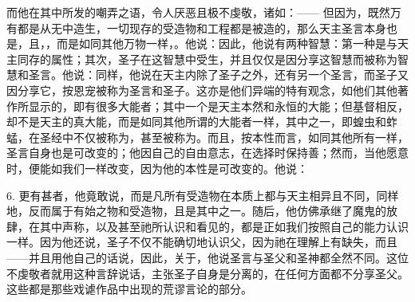 而他在其中所发的嘲弄之语，令人厌恶且极不虔敬，诸如：—— 但因为，既然万有都是从无中造生，一切现存的受造物和工程都是被造的，那么天主圣言本身也是，且，，而是如同其他万物一样，。他说：因此，他说有两种智慧：第一种是与天主同存的属性；其次，圣子在这智慧中受生，并且仅仅是因分享这智慧而被称为智慧和圣言。他说：同样，他说在天主内除了圣子之外，还有另一个圣言，而圣子又因分享它，按恩宠被称为圣言和圣子。这亦是他们异端的特有观念，如他们其他著作所显示的，即有很多大能者；其中一个是天主本然和永恒的大能；但基督相反，却不是天主的真大能，而是如同其他所谓的大能者一样，其中之一，即蝗虫和蚱蜢，在圣经中不仅被称为，甚至被称为。而且，按本性而言，如同其他所有一样，圣言自身也是可改变的；他因自己的自由意志，在选择时保持善；然而，当他愿意时，便能如我们一样改变，因为他的本性是可改变的。他说：\par

6. 更有甚者，他竟敢说，而是凡所有受造物在本质上都与天主相异且不同，同样地，反而属于有始之物和受造物，且是其中之一。随后，他仿佛承继了魔鬼的放肆，在其中声称，以及甚至祂所认识和看见的，都是正如我们按照自己的能力认识一样。因为他还说，圣子不仅不能确切地认识父，因为祂在理解上有缺失，而且——并且用他自己的话说，因此，关于，他说圣言与圣父和圣神都全然不同。这位不虔敬者就用这种言辞说话，主张圣子自身是分离的，在任何方面都不分享圣父。这些都是那些戏谑作品中出现的荒谬言论的部分。\par

